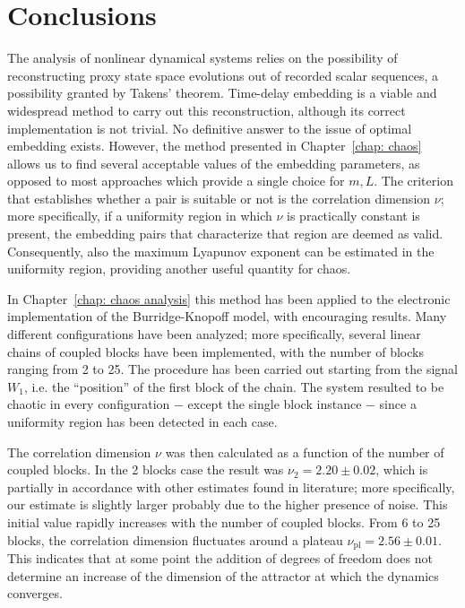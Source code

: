 \chapter*{Conclusions}

The analysis of nonlinear dynamical systems relies on the possibility of reconstructing proxy state space
evolutions out of recorded scalar sequences, a possibility granted by Takens' theorem. Time-delay
embedding is a viable and widespread method to carry out this reconstruction, although its correct
implementation is not trivial. No definitive answer to the issue of optimal embedding exists.
However, the method presented in Chapter~\ref{chap: chaos} allows us to find several acceptable
values of the embedding parameters, as opposed to most approaches which provide a single choice for
$m,L$. The criterion that establishes whether a pair is suitable or not is the correlation dimension
$\nu$; more specifically, if a uniformity region in which $\nu$ is practically constant is present,
the embedding pairs that characterize that region are deemed as valid. Consequently, also the maximum
Lyapunov exponent can be estimated in the uniformity region, providing another useful quantity for chaos.

In Chapter~\ref{chap: chaos analysis} this method has been applied to the electronic implementation of
the Burridge-Knopoff model, with encouraging results. Many different configurations have been analyzed;
more specifically, several linear chains of coupled blocks have been implemented, with the number of
blocks ranging from 2 to 25. The procedure has been carried out starting from the signal $W_1$, i.e.
the ``position'' of the first block of the chain. The system resulted to be chaotic in every
configuration $-$ except the single block instance $-$ since a uniformity region has been detected in
each case.

The correlation dimension $\nu$ was then calculated as a function of the number of coupled
blocks. In the 2 blocks case the result was $\nu_2=2.20\pm0.02$, which is partially in accordance with
other estimates found in literature; more specifically, our estimate is slightly larger probably due
to the higher presence of noise. This initial value rapidly increases with the
number of coupled blocks. From 6 to 25 blocks, the correlation dimension fluctuates around a plateau
$\nu_{\text{pl}}=2.56\pm0.01$.
This indicates that at some point the addition of degrees of freedom does not determine an increase
of the dimension of the attractor at which the dynamics converges.

